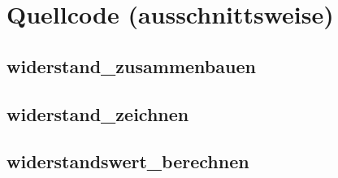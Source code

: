 \documentclass[a4paper,10pt,ngerman]{scrartcl}
\begin{document}




\section{Quellcode (ausschnittsweise)}
\subsection{widerstand\_zusammenbauen}


\subsection{widerstand\_zeichnen}
 

\subsection{widerstandswert\_berechnen}
 
\end{document}
